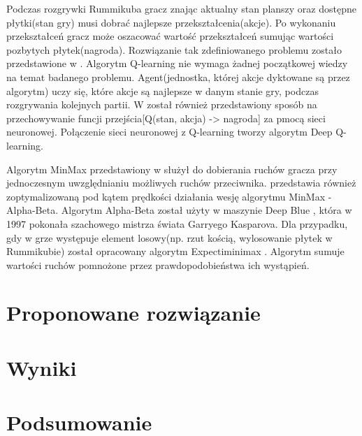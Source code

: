 \documentclass[twoside,twocolumn]{article}
\begin{document}
Podczas rozgrywki Rummikuba gracz znając aktualny stan planszy oraz dostępne płytki(stan gry) musi dobrać najlepsze 
przekształcenia(akcje). Po wykonaniu przekształceń gracz może oszacować wartość przekształceń sumując wartości pozbytych 
płytek(nagroda). Rozwiązanie tak zdefiniowanego problemu zostało przedstawione w \cite{Kaelbling:1996}. Algorytm Q-learning nie wymaga żadnej początkowej 
wiedzy na temat badanego problemu. Agent(jednostka, której akcje dyktowane są przez algorytm) uczy się, które akcje są najlepsze 
w danym stanie gry, podczas rozgrywania kolejnych partii. W \cite{Kaelbling:1996} został również przedstawiony sposób na przechowywanie funcji przejścia[Q(stan, akcja) -> nagroda] 
za pmocą sieci neuronowej. Połączenie sieci neuronowej z Q-learning tworzy algorytm Deep Q-learning.

Algorytm MinMax przedstawiony w \cite{Winston:1992} służył do dobierania ruchów gracza przy jednoczesnym uwzględnianiu możliwych ruchów przeciwnika. 
\cite{Winston:1992} przedstawia również zoptymalizowaną pod kątem prędkości działania wesję algorytmu MinMax - Alpha-Beta. Algorytm Alpha-Beta został użyty w maszynie  
Deep Blue\textsuperscript{\textregistered} \cite{Campbell:2002}, która w 1997 pokonała szachowego mistrza świata Garryego Kasparova. Dla przypadku, gdy w grze występuje 
element losowy(np. rzut kością, wylosowanie płytek w Rummikubie) został opracowany algorytm Expectiminimax \cite{Stuart:2009}. Algorytm sumuje wartości ruchów pomnożone 
przez prawdopodobieństwa ich wystąpień.

\section{Proponowane rozwiązanie}
\section{Wyniki}

\section{Podsumowanie}

\end{document}
